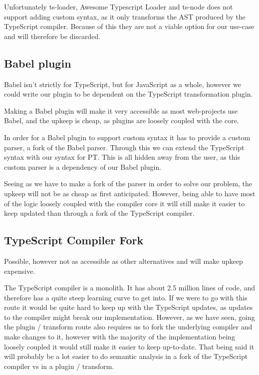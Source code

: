 Unfortunately ts-loader, Awesome Typescript Loader and ts-node does not support adding custom syntax, as it only transforms the AST produced by the TypeScript compiler.
Because of this they are not a viable option for our use-case and will therefore be discarded.

\subsection{Babel plugin}\label{subsec:babel-plugin}

Babel isn't strictly for TypeScript, but for JavaScript as a whole, however we could write our plugin to be dependent on the TypeScript transformation plugin.

Making a Babel plugin will make it very accessible as most web-projects use Babel, and the upkeep is cheap, as plugins are loosely coupled with the core.

In order for a Babel plugin to support custom syntax it has to provide a custom parser, a fork of the Babel parser.
Through this we can extend the TypeScript syntax with our syntax for PT.
This is all hidden away from the user, as this custom parser is a dependency of our Babel plugin.

Seeing as we have to make a fork of the parser in order to solve our problem, the upkeep will not be as cheap as first anticipated.
However, being able to have most of the logic loosely coupled with the compiler core it will still make it easier to keep updated than through a fork of the TypeScript compiler.


\subsection{TypeScript Compiler Fork}\label{subsec:typescript-compiler-fork}

Possible, however not as accessible as other alternatives and will make upkeep expensive.

The TypeScript compiler is a monolith.
It has about 2.5 million lines of code, and therefore has a quite steep learning curve to get into.
If we were to go with this route it would be quite hard to keep up with the TypeScript updates, as updates to the compiler might break our implementation.
However, as we have seen, going the plugin / transform route also requires us to fork the underlying compiler and make changes to it, however with the majority of the implementation being loosely coupled it would still make it easier to keep up-to-date.
That being said it will probably be a lot easier to do semantic analysis in a fork of the TypeScript compiler vs in a plugin / transform.
